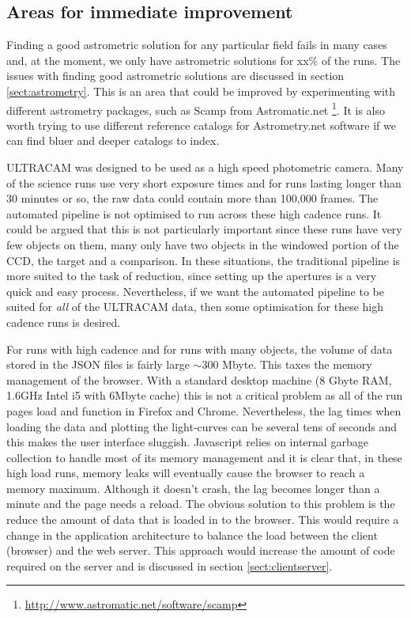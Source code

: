 \subsection{Areas for immediate improvement}
Finding a good astrometric solution for any particular field fails in many cases and, at the moment, we only have astrometric solutions for xx\% of the runs. The issues with finding good astrometric solutions are discussed in section \ref{sect:astrometry}. This is an area that could be improved by experimenting with different astrometry packages, such as Scamp from Astromatic.net \footnote{\url{http://www.astromatic.net/software/scamp}}. It is also worth trying to use different reference catalogs for Astrometry.net software if we can find bluer and deeper catalogs to index. 

ULTRACAM was designed to be used as a high speed photometric camera. Many of the science runs use very short exposure times and for runs lasting longer than 30 minutes or so, the raw data could contain more than 100,000 frames. The automated pipeline is not optimised to run across these high cadence runs. It could be argued that this is not particularly important since these runs have very few objects on them, many only have two objects in the windowed portion of the CCD, the target and a comparison. In these situations, the traditional pipeline is more suited to the task of reduction, since setting up the apertures is a very quick and easy process. Nevertheless, if we want the automated pipeline to be suited for \emph{all} of the ULTRACAM data, then some optimisation for these high cadence runs is desired. 

For runs with high cadence and for runs with many objects, the volume of data stored in the JSON files is fairly large $\sim 300$ Mbyte. This taxes the memory management of the browser. With a standard desktop machine (8 Gbyte RAM, 1.6GHz Intel i5 with 6Mbyte cache) this is not a critical problem as all of the run pages load and function in Firefox and Chrome. Nevertheless, the lag times when loading the data and plotting the light-curves can be several tens of seconds and this makes the user interface sluggish. Javascript relies on internal garbage collection to handle most of its memory management and it is clear that, in these high load runs, memory leaks will eventually cause the browser to reach a memory maximum. Although it doesn't crash, the lag becomes longer than a minute and the page needs a reload. The obvious solution to this problem is the reduce the amount of data that is loaded in to the browser. This would require a change in the application architecture to balance the load between the client (browser) and the web server. This approach would increase the amount of code required on the server and is discussed in section \ref{sect:clientserver}.  


